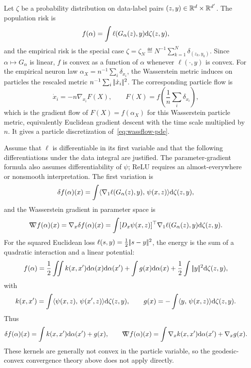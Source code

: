 Let $\zeta$ be a probability distribution on data-label pairs $(z,y)\in\mathbb{R}^d\times\mathbb{R}^{d'}$. The population risk is
\[
	f(\alpha)=\int \ell(G_\alpha(z),y)\mathrm{d}\zeta(z,y),
\]
and the empirical risk is the special case $\zeta=\zeta_N\eqdef N^{-1}\sum_{k=1}^N\delta_{(z_k,y_k)}$. Since $\alpha\mapsto G_\alpha$ is linear, $f$ is convex as a function of $\alpha$ whenever $\ell(\cdot,y)$ is convex. For the empirical neuron law $\alpha_X=n^{-1}\sum_i\delta_{x_i}$, the Wasserstein metric induces on particles the rescaled metric $n^{-1}\sum_i|\!| \dot x_i |\!|^2$. The corresponding particle flow is
\[
	\dot x_i=-n\nabla_{x_i}F(X),
	\qquad
	F(X)=f\!\left(\frac1n\sum_i\delta_{x_i}\right),
\]
which is the gradient flow of $F(X)=f(\alpha_X)$ for this Wasserstein particle metric, equivalently Euclidean gradient descent with the time scale multiplied by $n$. It gives a particle discretization of~\eqref{eq:wassflow-pde}.

Assume that $\ell$ is differentiable in its first variable and that the following differentiations under the data integral are justified. The parameter-gradient formula also assumes differentiability of $\psi$; ReLU requires an almost-everywhere or nonsmooth interpretation. The first variation is
\begin{equation}\label{eq-mlp-first-variation-general}
	\delta f(\alpha)(x)
	=
	\int
	\langle \nabla_1\ell(G_\alpha(z),y),\,\psi(x,z)\rangle
		\mathrm{d}\zeta(z,y),
\end{equation}
and the Wasserstein gradient in parameter space is
\[
	\mathord{\nabla\mkern-9.3mu\nabla} f(\alpha)(x)
	=
	\nabla_x\delta f(\alpha)(x)
	=
	\int
	[D_x\psi(x,z)]^\top\nabla_1\ell(G_\alpha(z),y)
		\mathrm{d}\zeta(z,y).
\]
For the squared Euclidean loss $\ell(s,y)=\frac12|\!| s-y |\!|^2$, the energy is the sum of a quadratic interaction and a linear potential:
\begin{equation}\label{eq-mlp-square-loss-quadratic-linear}
	f(\alpha)
	=
	\frac12\iint k(x,x')\mathrm{d}\alpha(x)\mathrm{d}\alpha(x')
	+
	\int g(x)\mathrm{d}\alpha(x)
	+\frac12\int|\!| y |\!|^2\mathrm{d}\zeta(z,y),
\end{equation}
with
\begin{equation}\label{eq-mlp-kernel-linear-potential}
	k(x,x')=\int\langle \psi(x,z),\,\psi(x',z)\rangle\mathrm{d}\zeta(z,y),
	\qquad
	g(x)=-\int\langle y,\,\psi(x,z)\rangle\mathrm{d}\zeta(z,y).
\end{equation}
Thus
\[
	\delta f(\alpha)(x)=\int k(x,x')\mathrm{d}\alpha(x')+g(x),
	\qquad
	\mathord{\nabla\mkern-9.3mu\nabla} f(\alpha)(x)=\int\nabla_x k(x,x')\mathrm{d}\alpha(x')+\nabla_xg(x).
\]
These kernels are generally not convex in the particle variable, so the geodesic-convex convergence theory above does not apply directly.

